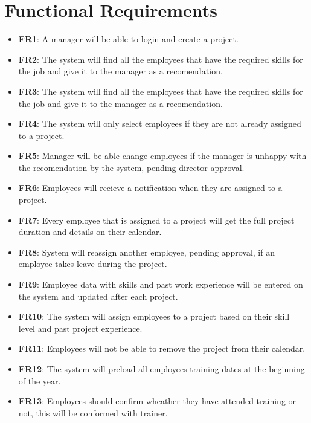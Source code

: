 \documentclass{article}
\begin{document}
\section{Functional Requirements}
	\begin{itemize}
		\item \textbf{FR1}: A manager will be able to login and create a project.
		
		\item \textbf{FR2}: The system will find all the employees that have the required skills for the job and give it to the manager as a recomendation.
		
		\item \textbf{FR3}: The system will find all the employees that have the required skills for the job and give it to the manager as a recomendation.
		
		\item \textbf{FR4}: The system will only select employees if they are not already assigned to a project.
		
		\item \textbf{FR5}: Manager will be able change employees if the manager is unhappy with the recomendation by the system, pending director approval.
		
		\item \textbf{FR6}: Employees will recieve a notification when they are assigned to a project.
		
		\item \textbf{FR7}: Every employee that is assigned to a project will get the full project duration and details on their calendar.
		
		\item \textbf{FR8}: System will reassign another employee, pending approval, if an employee takes leave during the project.
		
		\item \textbf{FR9}: Employee data with skills and past work experience will be entered on the system and updated after each project.
		
		\item \textbf{FR10}: The system will assign employees to a project based on their skill level and past project experience. 
		
		\item \textbf{FR11}: Employees will not be able to remove the project from their calendar.
		
		\item \textbf{FR12}: The system will preload all employees training dates at the beginning of the year.
		
		\item \textbf{FR13}: Employees should confirm wheather they have attended training or not, this will be conformed with trainer.
		
	\end{itemize}
\end{document}
